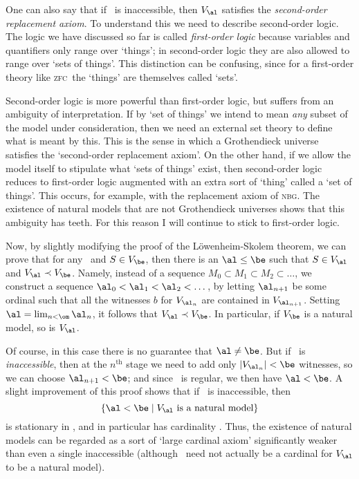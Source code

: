 \documentclass[12pt]{amsart}
\let\ee\prec
\def\zfc{\textsc{zfc}}
\def\nbg{\textsc{nbg}}
\begin{document}
\begin{rmk}
  One can also say that if \al\ is inaccessible, then $V_\al$
  satisfies the \emph{second-order replacement axiom}.  To understand
  this we need to describe second-order logic.  The logic we have
  discussed so far is called \emph{first-order logic} because
  variables and quantifiers only range over `things'; in second-order
  logic they are also allowed to range over `sets of things'.  This
  distinction can be confusing, since for a first-order theory like
  \zfc\ the `things' are themselves called `sets'.

  Second-order logic is more powerful than first-order logic, but
  suffers from an ambiguity of interpretation.  If by `set of things'
  we intend to mean \emph{any} subset of the model under
  consideration, then we need an external set theory to define what is
  meant by this.  This is the sense in which a Grothendieck universe
  satisfies the `second-order replacement axiom'.  On the other hand,
  if we allow the model itself to stipulate what `sets of things'
  exist, then second-order logic reduces to first-order logic
  augmented with an extra sort of `thing' called a `set of things'.
  This occurs, for example, with the replacement axiom of \nbg.  The
  existence of natural models that are not Grothendieck universes
  shows that this ambiguity has teeth.  For this reason I will
  continue to stick to first-order logic.
\end{rmk}

Now, by slightly modifying the proof of the L\"owenheim-Skolem
theorem, we can prove that for any \be\ and $S\in V_\be$, then there
is an $\al\le \be$ such that $S\in V_\al$ and $V_\al\ee V_\be$.
Namely, instead of a sequence $M_0\subset M_1\subset M_2\subset\dots$,
we construct a sequence $\al_0<\al_1<\al_2<\dots$, by letting
$\al_{n+1}$ be some ordinal such that all the witnesses $b$ for
$V_{\al_n}$ are contained in $V_{\al_{n+1}}$.  Setting $\al =
\lim_{n<\om} \al_n$, it follows that $V_\al\ee V_\be$.  In particular,
if $V_\be$ is a natural model, so is $V_\al$.

Of course, in this case there is no guarantee that $\al\neq\be$.  But
if \be\ is \emph{inaccessible}, then at the $n^{\mathrm{th}}$ stage we
need to add only $|V_{\al_n}|<\be$ witnesses, so we can choose
$\al_{n+1}<\be$; and since \be\ is regular, we then have $\al<\be$.  A
slight improvement of this proof shows that if \be\ is inaccessible,
then
\[\{\al<\be \mid V_\al \text{ is a natural model}\}
\]
is stationary in \be, and in particular has cardinality \be.  Thus,
the existence of natural models can be regarded as a sort of `large
cardinal axiom' significantly weaker than even a single inaccessible
(although \al\ need not actually be a cardinal for $V_\al$ to be a
natural model).
\end{document}
